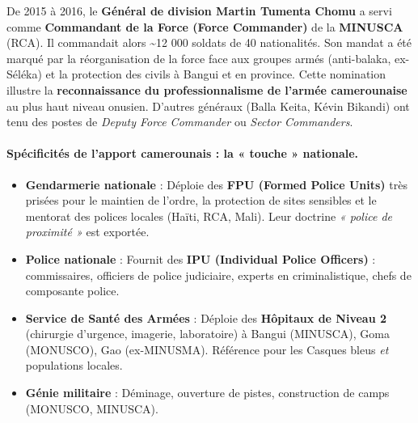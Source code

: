 \documentclass[11pt]{article}
\begin{document}
\begin{savaistu}
De 2015 à 2016, le \textbf{Général de division Martin Tumenta Chomu} a servi comme \textbf{Commandant de la Force (Force Commander)} de la \textbf{MINUSCA} (RCA). Il commandait alors \textasciitilde 12 000 soldats de 40 nationalités. Son mandat a été marqué par la réorganisation de la force face aux groupes armés (anti-balaka, ex-Séléka) et la protection des civils à Bangui et en province. Cette nomination illustre la \textbf{reconnaissance du professionnalisme de l'armée camerounaise} au plus haut niveau onusien. D'autres généraux (Balla Keita, Kévin Bikandi) ont tenu des postes de \emph{Deputy Force Commander} ou \emph{Sector Commanders}.
\end{savaistu}

\paragraph{Spécificités de l'apport camerounais : la « touche » nationale.}
\begin{itemize}
    \item \textbf{Gendarmerie nationale} : Déploie des \textbf{FPU (Formed Police Units)} très prisées pour le maintien de l'ordre, la protection de sites sensibles et le mentorat des polices locales (Haïti, RCA, Mali). Leur doctrine \emph{« police de proximité »} est exportée.
    \item \textbf{Police nationale} : Fournit des \textbf{IPU (Individual Police Officers)} : commissaires, officiers de police judiciaire, experts en criminalistique, chefs de composante police.
    \item \textbf{Service de Santé des Armées} : Déploie des \textbf{Hôpitaux de Niveau 2} (chirurgie d'urgence, imagerie, laboratoire) à Bangui (MINUSCA), Goma (MONUSCO), Gao (ex-MINUSMA). Référence pour les Casques bleus \emph{et} populations locales.
    \item \textbf{Génie militaire} : Déminage, ouverture de pistes, construction de camps (MONUSCO, MINUSCA).
\end{itemize}
\end{document}
